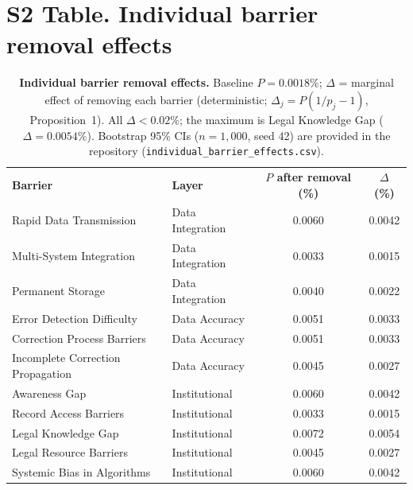 \documentclass[10pt,letterpaper]{article}
\newlength\savedwidth
\newcommand\thickhline{\noalign{\global\savedwidth\arrayrulewidth\global\arrayrulewidth 2pt}\hline\noalign{\global\arrayrulewidth\savedwidth}}
\begin{document}
\section*{S2 Table. Individual barrier removal effects}
\begin{table}[!ht]\centering
\caption{{\bf Individual barrier removal effects.} Baseline $P=0.0018\%$; $\Delta$ = marginal effect of removing each barrier (deterministic; $\Delta_j=P(1/p_j-1)$, Proposition~1). All $\Delta<0.02\%$; the maximum is Legal Knowledge Gap ($\Delta=0.0054\%$). Bootstrap 95\% CIs ($n=1{,}000$, seed 42) are provided in the repository (\texttt{individual\_barrier\_effects.csv}).}
\label{S2}
\begin{tabular}{l l c c}
\hline \textbf{Barrier} & \textbf{Layer} & \textbf{$P$ after removal (\%)} & \textbf{$\Delta$ (\%)} \\ \thickhline
Rapid Data Transmission & Data Integration & 0.0060 & 0.0042 \\
Multi-System Integration & Data Integration & 0.0033 & 0.0015 \\
Permanent Storage & Data Integration & 0.0040 & 0.0022 \\ \hline
Error Detection Difficulty & Data Accuracy & 0.0051 & 0.0033 \\
Correction Process Barriers & Data Accuracy & 0.0051 & 0.0033 \\
Incomplete Correction Propagation & Data Accuracy & 0.0045 & 0.0027 \\ \hline
Awareness Gap & Institutional & 0.0060 & 0.0042 \\
Record Access Barriers & Institutional & 0.0033 & 0.0015 \\
Legal Knowledge Gap & Institutional & 0.0072 & 0.0054 \\
Legal Resource Barriers & Institutional & 0.0045 & 0.0027 \\
Systemic Bias in Algorithms & Institutional & 0.0060 & 0.0042 \\ \hline
\end{tabular}
\end{table}

\end{document}
